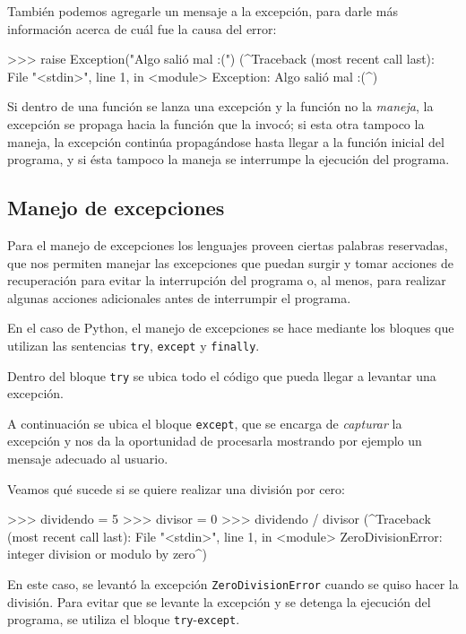 También podemos agregarle un mensaje a la excepción, para darle más información
acerca de cuál fue la causa del error:

\begin{codigo-python-sn}
>>> raise Exception("Algo salió mal :(")
(^Traceback (most recent call last):
  File "<stdin>", line 1, in <module>
Exception: Algo salió mal :(^)
\end{codigo-python-sn}

Si dentro de una función se lanza una excepción y la función no la
\emph{maneja}, la excepción se propaga hacia la función que la invocó; si esta otra
tampoco la maneja, la excepción continúa propagándose hasta llegar a la función
inicial del programa, y si ésta tampoco la maneja se interrumpe la ejecución
del programa.

\subsection{Manejo de excepciones}

Para el manejo de excepciones los lenguajes proveen ciertas palabras
reservadas, que nos permiten manejar las excepciones que puedan surgir y
tomar acciones de recuperación para evitar la interrupción del programa o,
al menos, para realizar algunas acciones adicionales antes de interrumpir
el programa.

En el caso de Python, el manejo de excepciones se hace mediante los
bloques que utilizan las sentencias \lstinline!try!, \lstinline!except! y
\lstinline!finally!.

Dentro del bloque \lstinline!try! se ubica todo el código que pueda llegar
a levantar una excepción.

A continuación se ubica el bloque \lstinline!except!, que se encarga de
\emph{capturar} la excepción y nos da la oportunidad de procesarla mostrando por
ejemplo un mensaje adecuado al usuario.

Veamos qué sucede si se quiere realizar una división por cero:

\begin{codigo-python-sn}
>>> dividendo = 5
>>> divisor = 0
>>> dividendo / divisor
(^Traceback (most recent call last):
  File "<stdin>", line 1, in <module>
ZeroDivisionError: integer division or modulo by zero^)
\end{codigo-python-sn}

En este caso, se levantó la excepción \lstinline!ZeroDivisionError! cuando se
quiso hacer la división.  Para evitar que se levante la excepción y se detenga
la ejecución del programa, se utiliza el bloque
\lstinline!try!-\lstinline!except!.

